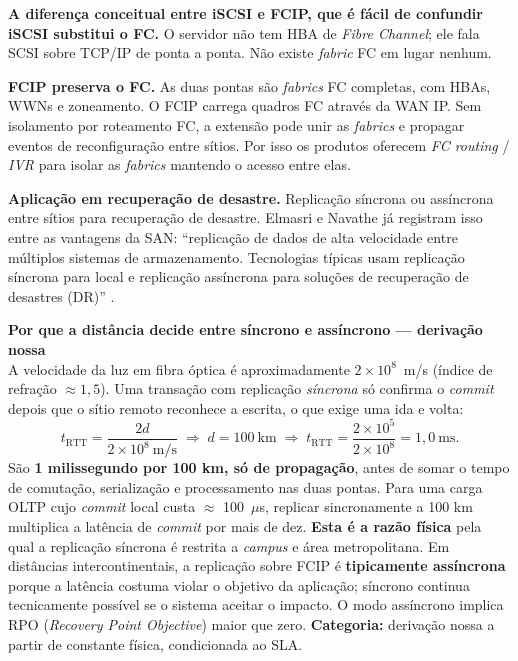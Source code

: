 \documentclass[11pt,a4paper]{article}
\newcommand{\destaque}[2]{%
  \begin{center}\begin{minipage}{0.96\textwidth}
  \colorbox{fundo}{\begin{minipage}{\dimexpr\linewidth-2\fboxsep}
  \vspace{2pt}\textbf{\color{azul}\small #1}\\[1pt]\footnotesize #2\vspace{3pt}
  \end{minipage}}\end{minipage}\end{center}}
\begin{document}
\destaque{A diferença conceitual entre iSCSI e FCIP, que é fácil de confundir}{%
\textbf{iSCSI substitui o FC.} O servidor não tem HBA de \textit{Fibre Channel}; ele fala SCSI
sobre TCP/IP de ponta a ponta. Não existe \textit{fabric} FC em lugar nenhum.

\smallskip
\textbf{FCIP preserva o FC.} As duas pontas são \textit{fabrics} FC completas, com HBAs, WWNs e
zoneamento. O FCIP carrega quadros FC através da WAN IP. Sem isolamento por roteamento FC,
a extensão pode unir as \textit{fabrics} e propagar eventos de reconfiguração entre sítios.
Por isso os produtos oferecem \textit{FC routing} / \textit{IVR} para isolar as \textit{fabrics}
mantendo o acesso entre elas.}

\textbf{Aplicação em recuperação de desastre.} Replicação síncrona ou assíncrona entre sítios para
recuperação de desastre. Elmasri e Navathe já registram isso entre as vantagens da SAN:
``replicação de dados de alta velocidade entre múltiplos sistemas de armazenamento. Tecnologias
típicas usam replicação síncrona para local e replicação assíncrona para soluções de recuperação de
desastres (DR)'' \cite{elmasri2018}.

\destaque{Por que a distância decide entre síncrono e assíncrono --- derivação nossa}{%
A velocidade da luz em fibra óptica é aproximadamente $2 \times 10^8$~m/s (índice de refração
$\approx 1{,}5$). Uma transação com replicação \emph{síncrona} só confirma o \textit{commit} depois
que o sítio remoto reconhece a escrita, o que exige uma ida e volta:
\[
t_{\text{RTT}} = \frac{2d}{2\times10^{8}\ \text{m/s}}
\;\Rightarrow\;
d = 100\ \text{km} \;\Rightarrow\; t_{\text{RTT}} = \frac{2\times10^{5}}{2\times10^{8}} = 1{,}0\ \text{ms}.
\]
São \textbf{1 milissegundo por 100 km, só de propagação}, antes de somar o tempo de comutação,
serialização e processamento nas duas pontas. Para uma carga OLTP cujo \textit{commit} local custa
$\approx$ 100~$\mu$s, replicar sincronamente a 100 km multiplica a latência de \textit{commit} por
mais de dez. \textbf{Esta é a razão física} pela qual a replicação síncrona é restrita a
\textit{campus} e área metropolitana. Em distâncias intercontinentais, a replicação sobre
FCIP é \textbf{tipicamente assíncrona} porque a latência costuma violar o objetivo da
aplicação; síncrono continua tecnicamente possível se o sistema aceitar o impacto. O modo
assíncrono implica RPO (\textit{Recovery Point Objective}) maior que zero.
\textbf{Categoria:} derivação nossa a partir de constante física, condicionada ao SLA.}
\end{document}
